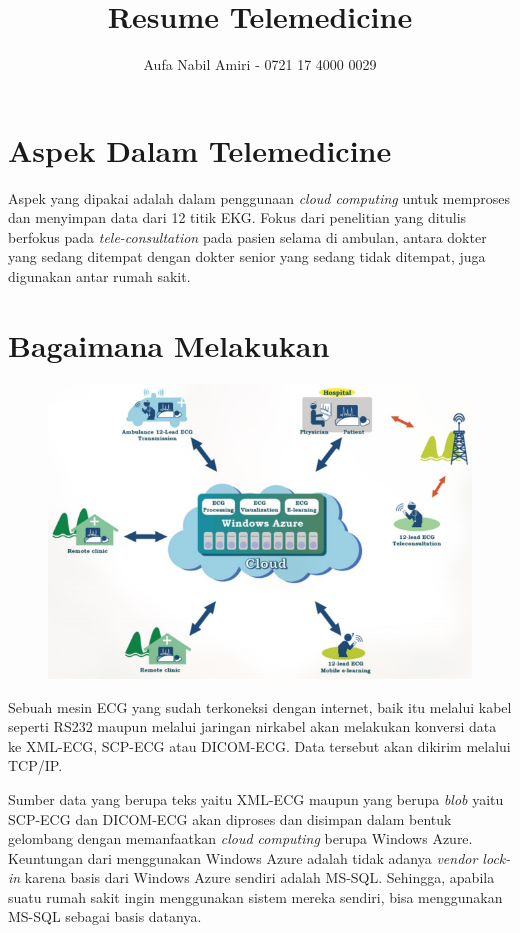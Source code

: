 \documentclass[12pt, a4paper]{article}
\title{Resume Telemedicine}
\author{Aufa Nabil Amiri - 0721 17 4000 0029}
\date{}
\makeatletter
\renewcommand{\maketitle}{\bgroup\setlength{\parindent}{0pt}
\begin{flushleft}
  \LARGE\textbf{\@title}

  \normalsize\@author
\end{flushleft}\egroup
}
\makeatother
\begin{document}
\maketitle

\section*{Aspek Dalam Telemedicine}

Aspek yang dipakai adalah dalam penggunaan \textit{cloud computing} untuk memproses dan menyimpan data dari 12 titik EKG. Fokus dari penelitian yang ditulis berfokus pada \textit{tele-consultation} pada pasien selama di ambulan, antara dokter yang sedang ditempat dengan dokter senior yang sedang tidak ditempat, juga digunakan antar rumah sakit.

\section*{Bagaimana Melakukan}

\begin{figure}[h!]
    \begin{center}
        \includegraphics[width=\linewidth]{grafik2.png}
    \end{center}
\end{figure}

Sebuah mesin ECG yang sudah terkoneksi dengan internet, baik itu melalui kabel seperti RS232 maupun melalui jaringan nirkabel akan melakukan konversi data ke XML-ECG, SCP-ECG atau DICOM-ECG. Data tersebut akan dikirim melalui TCP/IP.

Sumber data yang berupa teks yaitu XML-ECG maupun yang berupa \textit{blob} yaitu SCP-ECG dan DICOM-ECG akan diproses dan disimpan dalam bentuk gelombang dengan memanfaatkan \textit{cloud computing} berupa Windows Azure. Keuntungan dari menggunakan Windows Azure adalah tidak adanya \textit{vendor lock-in} karena basis dari Windows Azure sendiri adalah MS-SQL. Sehingga, apabila suatu rumah sakit ingin menggunakan sistem mereka sendiri, bisa menggunakan MS-SQL sebagai basis datanya.
\end{document}
